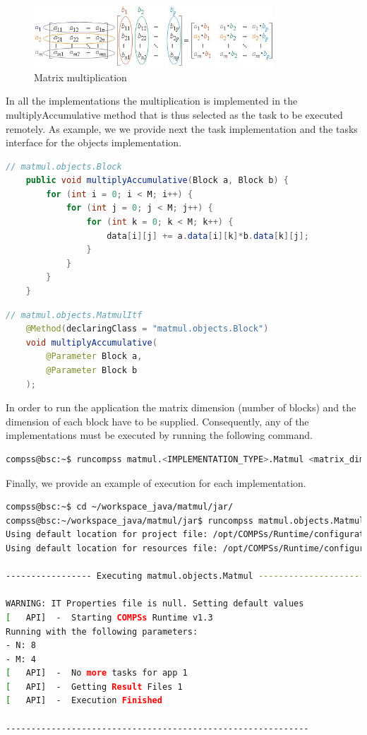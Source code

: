 \begin{figure}[ht!]
  \centering
    \includegraphics[width=0.8\textwidth]{./Sections/2_Java/Figures/matrix.jpeg}
    \caption{Matrix multiplication} 
    \label{fig:matrix}
\end{figure}

\newpage 
In all the implementations the multiplication is implemented in the multiplyAccumulative method that is thus selected as the task to be executed remotely.
As example, we we provide next the task implementation and the tasks interface for the objects implementation.

\begin{lstlisting}[language=java]
	// matmul.objects.Block
	public void multiplyAccumulative(Block a, Block b) {
		for (int i = 0; i < M; i++) {
			for (int j = 0; j < M; j++) {
				for (int k = 0; k < M; k++) {
					data[i][j] += a.data[i][k]*b.data[k][j];
				}
			}
		}
	}
\end{lstlisting}

\begin{lstlisting}[language=java]
	// matmul.objects.MatmulItf
	@Method(declaringClass = "matmul.objects.Block")
	void multiplyAccumulative(
		@Parameter Block a,
		@Parameter Block b
	);
\end{lstlisting}

In order to run the application the matrix dimension (number of blocks) and the dimension of each block have to be supplied. Consequently, any of the 
implementations must be executed by running the following command.
\begin{lstlisting}[language=bash]
compss@bsc:~$ runcompss matmul.<IMPLEMENTATION_TYPE>.Matmul <matrix_dim> <block_dim>
\end{lstlisting}

Finally, we provide an example of execution for each implementation.

\begin{lstlisting}[language=bash]
compss@bsc:~$ cd ~/workspace_java/matmul/jar/
compss@bsc:~/workspace_java/matmul/jar$ runcompss matmul.objects.Matmul 8 4
Using default location for project file: /opt/COMPSs/Runtime/configuration/xml/projects/project.xml
Using default location for resources file: /opt/COMPSs/Runtime/configuration/xml/resources/resources.xml

----------------- Executing matmul.objects.Matmul --------------------------

WARNING: IT Properties file is null. Setting default values
[   API]  -  Starting COMPSs Runtime v1.3
Running with the following parameters:
- N: 8
- M: 4
[   API]  -  No more tasks for app 1
[   API]  -  Getting Result Files 1
[   API]  -  Execution Finished

------------------------------------------------------------
\end{lstlisting}

